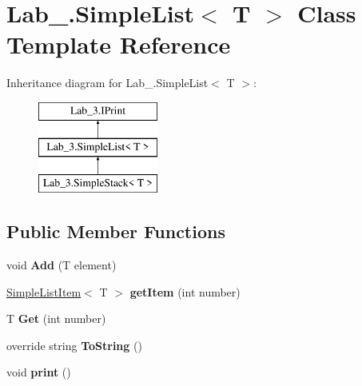 \hypertarget{class_lab__3_1_1_simple_list}{}\section{Lab\+\_.\+Simple\+List$<$ T $>$ Class Template Reference}
\label{class_lab__3_1_1_simple_list}
Inheritance diagram for Lab\+\_.\+Simple\+List$<$ T $>$\+:\begin{figure}[H]
\begin{center}
\leavevmode
\includegraphics[height=3.000000cm]{class_lab__3_1_1_simple_list}
\end{center}
\end{figure}
\subsection*{Public Member Functions}
\begin{DoxyCompactItemize}
\item 
\mbox{\label{class_lab__3_1_1_simple_list_a9bd28dd4f80bf25e7c05d85be8f913f3}} 
void {\bfseries Add} (T element)
\item 
\mbox{\label{class_lab__3_1_1_simple_list_a81f906eafcb867d5d10ca323456dbf70}} 
\hyperlink{class_lab__3_1_1_simple_list_item}{Simple\+List\+Item}$<$ T $>$ {\bfseries get\+Item} (int number)
\item 
\mbox{\label{class_lab__3_1_1_simple_list_ac3bdb6cf211c6def760744914c89bac0}} 
T {\bfseries Get} (int number)
\item 
\mbox{\label{class_lab__3_1_1_simple_list_a06c6221695fe05b4e55d1d326bd34c68}} 
override string {\bfseries To\+String} ()
\item 
\mbox{\label{class_lab__3_1_1_simple_list_add4d78c448d7b3a8cb290b2d1fac89fa}} 
void {\bfseries print} ()
\end{DoxyCompactItemize}
